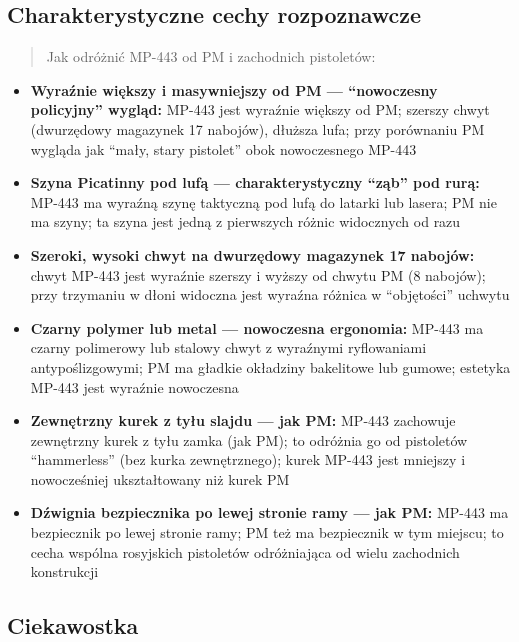 \documentclass[12pt,oneside]{book}
\providecommand{\tightlist}{%
  \setlength{\itemsep}{0pt}\setlength{\parskip}{0pt}}
\begin{document}
\subsection{Charakterystyczne cechy
rozpoznawcze}\label{charakterystyczne-cechy-rozpoznawcze-106}

\begin{quote}
Jak odróżnić MP-443 od PM i zachodnich pistoletów:
\end{quote}

\begin{itemize}
\tightlist
\item
  \textbf{Wyraźnie większy i masywniejszy od PM --- ``nowoczesny
  policyjny'' wygląd:} MP-443 jest wyraźnie większy od PM; szerszy chwyt
  (dwurzędowy magazynek 17 nabojów), dłuższa lufa; przy porównaniu PM
  wygląda jak ``mały, stary pistolet'' obok nowoczesnego MP-443
\item
  \textbf{Szyna Picatinny pod lufą --- charakterystyczny ``ząb'' pod
  rurą:} MP-443 ma wyraźną szynę taktyczną pod lufą do latarki lub
  lasera; PM nie ma szyny; ta szyna jest jedną z pierwszych różnic
  widocznych od razu
\item
  \textbf{Szeroki, wysoki chwyt na dwurzędowy magazynek 17 nabojów:}
  chwyt MP-443 jest wyraźnie szerszy i wyższy od chwytu PM (8 nabojów);
  przy trzymaniu w dłoni widoczna jest wyraźna różnica w ``objętości''
  uchwytu
\item
  \textbf{Czarny polymer lub metal --- nowoczesna ergonomia:} MP-443 ma
  czarny polimerowy lub stalowy chwyt z wyraźnymi ryflowaniami
  antypoślizgowymi; PM ma gładkie okładziny bakelitowe lub gumowe;
  estetyka MP-443 jest wyraźnie nowoczesna
\item
  \textbf{Zewnętrzny kurek z tyłu slajdu --- jak PM:} MP-443 zachowuje
  zewnętrzny kurek z tyłu zamka (jak PM); to odróżnia go od pistoletów
  ``hammerless'' (bez kurka zewnętrznego); kurek MP-443 jest mniejszy i
  nowocześniej ukształtowany niż kurek PM
\item
  \textbf{Dźwignia bezpiecznika po lewej stronie ramy --- jak PM:}
  MP-443 ma bezpiecznik po lewej stronie ramy; PM też ma bezpiecznik w
  tym miejscu; to cecha wspólna rosyjskich pistoletów odróżniająca od
  wielu zachodnich konstrukcji
\end{itemize}

\subsection{Ciekawostka}\label{ciekawostka-106}
\end{document}
